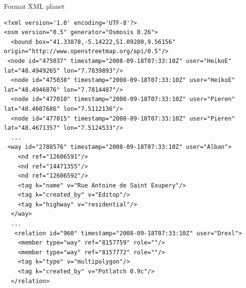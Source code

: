 


\begin{frame}[fragile]{Format XML planet}

\tiny
\begin{verbatim}
<?xml version='1.0' encoding='UTF-8'?>
<osm version="0.5" generator="Osmosis 0.26">
  <bound box="41.33878,-5.14222,51.09280,9.56156" origin="http://www.openstreetmap.org/api/0.5"/>
 <node id="475037" timestamp="2008-09-18T07:33:10Z" user="HeikoE" lat="48.4949265" lon="7.7839893"/>
  <node id="475038" timestamp="2008-09-18T07:33:10Z" user="HeikoE" lat="48.4946876" lon="7.7814487"/>
  <node id="477010" timestamp="2008-09-18T07:33:10Z" user="Pieren" lat="48.4607686" lon="7.5112136"/>
  <node id="477015" timestamp="2008-09-18T07:33:10Z" user="Pieren" lat="48.4671357" lon="7.5124533"/>
  ...
 <way id="2788576" timestamp="2008-09-18T07:33:10Z" user="Alban">
    <nd ref="12606591"/>
    <nd ref="14471355"/>
    <nd ref="12606592"/>
    <tag k="name" v="Rue Antoine de Saint Exupery"/>
    <tag k="created_by" v="Editop"/>
    <tag k="highway" v="residential"/>
  </way>
  ...
   <relation id="960" timestamp="2008-09-18T07:33:10Z" user="Drexl">
    <member type="way" ref="8157759" role=""/>
    <member type="way" ref="8157772" role=""/>
    <tag k="type" v="multipolygon"/>
    <tag k="created_by" v="Potlatch 0.9c"/>
  </relation>
\end{verbatim}

\end{frame}



